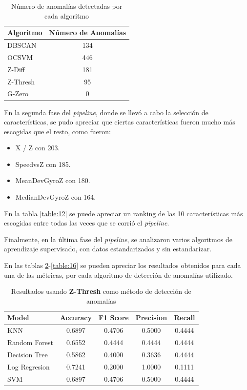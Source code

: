	\begin{table}[htb]
		\centering
		\caption{Número de anomalías detectadas por cada algoritmo}
		\label{table:3}
		\begin{tabular}{lc}
			\toprule
			 Algoritmo &  Número de Anomalías \\
			\midrule
				DBSCAN &                  134 \\
				 OCSVM &                  446 \\
				Z-Diff &                  181 \\
			   Z-Thresh &                   95 \\
				G-Zero &                    0 \\
			\bottomrule
		\end{tabular}
		
	\end{table}

	En la segunda fase del \emph{pipeline}, donde se llevó a cabo la selección de características, se pudo apreciar que ciertas características fueron
	mucho más escogidas que el resto, como fueron: 

	\begin{itemize}
		\item X / Z con 203.
		\item SpeedvsZ con 185.
		\item MeanDevGyroZ con 180.
		\item MedianDevGyroZ con 164.
	\end{itemize}

	En la tabla \ref{table:12} se puede apreciar un ranking de las 10 características más escogidas entre todas las veces que se corrió el \emph{pipeline}.

	Finalmente, en la última fase del \emph{pipeline}, se analizaron varios algoritmos de aprendizaje supervisado, con datos estandarizados y sin
	estandarizar. 
	\newpage

	En las tablas \ref{table:13}-\ref{table:16} se pueden apreciar los resultados obtenidos para cada una de las métricas, por cada algoritmo de detección de 
	anomalías utilizado.

	\begin{table}[htb]
		\centering
		\caption{Resultados usando \textbf{Z-Thresh} como método de detección de anomalías}
		\label{table:13}
		\begin{tabular}{lcccc}
		\toprule
				Model &  Accuracy &  F1 Score &  Precision &  Recall \\
		\midrule
				  KNN &    0.6897 &    0.4706 &     0.5000 &  0.4444 \\
		Random Forest &    0.6552 &    0.4444 &     0.4444 &  0.4444 \\
		Decision Tree &    0.5862 &    0.4000 &     0.3636 &  0.4444 \\
		Log Regresion &    0.7241 &    0.2000 &     1.0000 &  0.1111 \\
				  SVM &    0.6897 &    0.4706 &     0.5000 &  0.4444 \\
		\bottomrule
		\end{tabular}
	\end{table}

